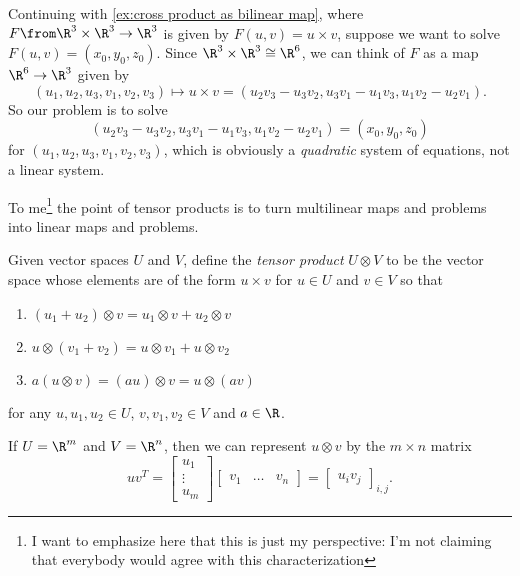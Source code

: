 \begin{example}\label{ex:cross product as bilinear map 2}
	Continuing with \cref{ex:cross product as bilinear map}, where $F \from \R^3 \times \R^3 \to \R^3$ is given by $F(u,v) = u \times v$, suppose we want to solve $F(u,v) = (x_0,y_0,z_0)$. Since $\R^3 \times \R^3 \cong \R^6$, we can think of $F$ as a map $\R^6 \to \R^3$ given by
	\[
		(u_1,u_2,u_3,v_1,v_2,v_3) \mapsto u \times v = (u_2 v_3 - u_3 v_2, u_3 v_1 - u_1 v_3, u_1 v_2 - u_2 v_1).
	\]
	So our problem is to solve
	\[
		(u_2 v_3 - u_3 v_2, u_3 v_1 - u_1 v_3, u_1 v_2 - u_2 v_1) = (x_0,y_0,z_0)
	\]
	for $(u_1,u_2,u_3,v_1,v_2,v_3)$, which is obviously a \emph{quadratic} system of equations, not a linear system.
\end{example}

To me\footnote{I want to emphasize here that this is just my perspective: I'm not claiming that everybody would agree with this characterization} the point of tensor products is to turn multilinear maps and problems into linear maps and problems.

\begin{definition}\label{def:tensor product}
	Given vector spaces $U$ and $V$, define the \emph{tensor product} $U \otimes V$ to be the vector space whose elements are of the form $u \times v$ for $u \in U$ and $v \in V$ so that 
	\begin{enumerate}
		\item $(u_1 + u_2) \otimes v = u_1 \otimes v + u_2 \otimes v$
		\item $u \otimes (v_1 + v_2) = u \otimes v_1 + u \otimes v_2$
		\item $a(u \otimes v) = (au) \otimes v = u \otimes (av)$
	\end{enumerate}
	for any $u,u_1,u_2 \in U$, $v,v_1,v_2 \in V$ and $a \in \R$.
\end{definition}

\begin{example}\label{ex:tensor product and outer product}
	If $U = \R^m$ and $V = \R^n$, then we can represent $u \otimes v$ by the $m \times n$ matrix 
	\[
		uv^T = \begin{bmatrix} u_1 \\ \vdots \\ u_m \end{bmatrix} \begin{bmatrix} v_1 & \dots & v_n \end{bmatrix} = \begin{bmatrix} u_i v_j \end{bmatrix}_{i,j}.
	\]
\end{example}

